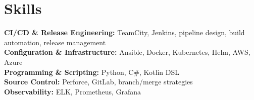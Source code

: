 \section*{Skills}
\textbf{CI/CD \& Release Engineering:} TeamCity, Jenkins, pipeline design, build automation, release management \\
\textbf{Configuration \& Infrastructure:} Ansible, Docker, Kubernetes, Helm, AWS, Azure \\
\textbf{Programming \& Scripting:} Python, C\#, Kotlin DSL \\
\textbf{Source Control:} Perforce, GitLab, branch/merge strategies \\
\textbf{Observability:} ELK, Prometheus, Grafana
